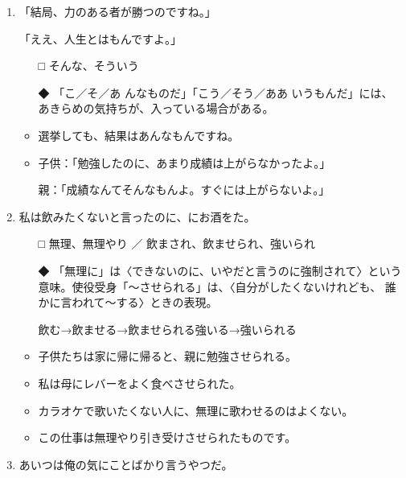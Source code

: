 \documentclass[
uplatex,
b5paper,
10pt,
dvipdfmx
]{jsbook}
\begin{document}
\begin{enumerate}
\item 「結局、力のある者が勝つのですね。」

      「ええ、人生とは\underline{\hspace{3zw}}もんですよ。」

\begin{itemize}
\item[□] そんな、そういう
\item[◆] 「こ／そ／あ んなものだ」「こう／そう／ああ いうもんだ」には、
	  あきらめの気持ちが、入っている場合がある。
\end{itemize}
\begin{itemize}
 \item 選挙しても、結果はあんなもんですね。
 \item 子供：「勉強したのに、あまり成績は上がらなかったよ。」

       親：「成績なんてそんなもんよ。すぐには上がらないよ。」
\end{itemize}

\item 私は飲みたくないと言ったのに、\underline{\hspace{3zw}}にお酒を\underline{\hspace{3zw}}た。

\begin{itemize}
\item[□] 無理、無理やり ／ 飲まされ、飲ませられ、強いられ
\item[◆] 「無理に」は〈できないのに、いやだと言うのに強制されて〉という
	  意味。使役受身「〜させられる」は、〈自分がしたくないけれども、
	  誰かに言われて〜する〉ときの表現。

	  飲む→飲ませる→飲ませられる強いる→強いられる
\end{itemize}
\begin{itemize}
\item 子供たちは家に帰に帰ると、親に勉強させられる。
\item 私は母にレバーをよく食べさせられた。
\item カラオケで歌いたくない人に、無理に歌わせるのはよくない。
\item この仕事は無理やり引き受けさせられたものです。
\end{itemize}

\item あいつは俺の気に\underline{\hspace{3zw}}ことばかり言うやつだ。


\end{enumerate}
\end{document}
